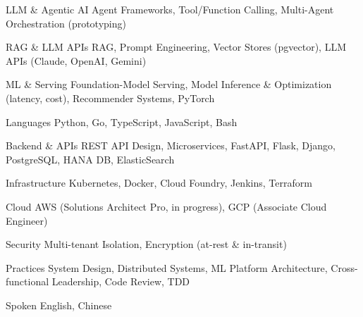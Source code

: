 

\begin{cvskills}

  \cvskill
    {LLM \& Agentic AI} %
    {Agent Frameworks, Tool/Function Calling, Multi-Agent Orchestration (prototyping)} %

  \cvskill
    {RAG \& LLM APIs} %
    {RAG, Prompt Engineering, Vector Stores (pgvector), LLM APIs (Claude, OpenAI, Gemini)} %

  \cvskill
    {ML \& Serving} %
    {Foundation-Model Serving, Model Inference \& Optimization (latency, cost), Recommender Systems, PyTorch} %

  \cvskill
    {Languages} %
    {Python, Go, TypeScript, JavaScript, Bash} %

  \cvskill
    {Backend \& APIs} %
    {REST API Design, Microservices, FastAPI, Flask, Django, PostgreSQL, HANA DB, ElasticSearch} %

  \cvskill
    {Infrastructure} %
    {Kubernetes, Docker, Cloud Foundry, Jenkins, Terraform} %

  \cvskill
    {Cloud} %
    {AWS (Solutions Architect Pro, in progress), GCP (Associate Cloud Engineer)} %

  \cvskill
    {Security} %
    {Multi-tenant Isolation, Encryption (at-rest \& in-transit)} %

  \cvskill
    {Practices} %
    {System Design, Distributed Systems, ML Platform Architecture, Cross-functional Leadership, Code Review, TDD} %

  \cvskill
    {Spoken} %
    {English, Chinese} %


\end{cvskills}
